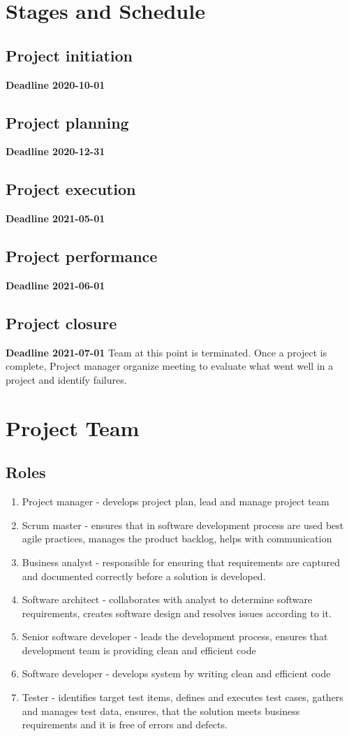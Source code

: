 \documentclass{VUMIFPSkursinis}
\begin{document}
		

\section{Stages and Schedule}
	\subsection{Project initiation}
	\textbf{Deadline 2020-10-01}
	\subsection{Project planning}
	\textbf{Deadline 2020-12-31}
	\subsection{Project execution}
	\textbf{Deadline 2021-05-01}
	\subsection{Project performance} 
	\textbf{Deadline 2021-06-01}
	\subsection{Project closure}
	\textbf{Deadline 2021-07-01}
	Team at this point is terminated. Once a project is complete, Project manager organize meeting to evaluate what went well in a project and identify failures.

\section{Project Team}
	\subsection{Roles}
	\begin{enumerate}
		\item{Project manager} - develops project plan, lead and manage project team
		\item{Scrum master} - ensures that in software development process are used best agile practices, manages the product backlog, helps with communication
		\item{Business analyst} - responsible for ensuring that requirements are captured and documented correctly before a solution is developed.
		\item{Software architect} - collaborates with analyst to determine software requirements, creates software design and resolves issues according to it.
		\item{Senior software developer} - leads the development process, ensures that development team is providing clean and efficient code
		\item{Software developer} - develops system by writing clean and efficient code
		\item{Tester} - identifies target test items, defines and executes test cases, gathers and manages test data, ensures, that the solution meets business requirements and it is free of errors and defects.
	\end{enumerate}
	
\end{document}
